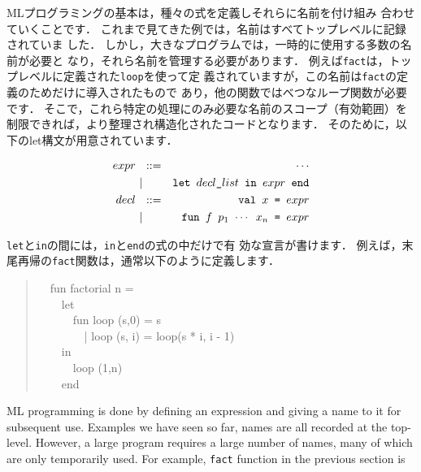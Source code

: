 \documentclass{jbook}
\newcommand{\vbar}{\mbox{\ $|$\ }}
\newcommand{\myem}{\mbox{\ \ }}
\begin{document}
\ifjp%
	MLプログラミングの基本は，種々の式を定義しそれらに名前を付け組み
合わせていくことです．
	これまで見てきた例では，名前はすべてトップレベルに記録されていま
した．
	しかし，大きなプログラムでは，一時的に使用する多数の名前が必要と
なり，それら名前を管理する必要があります．
	例えば{\tt fact}は，トップレベルに定義された{\tt loop}を使って定
義されていますが，この名前は{\tt fact}の定義のためだけに導入されたもので
あり，他の関数ではべつなループ関数が必要です．
	そこで，これら特定の処理にのみ必要な名前のスコープ（有効範囲）を
制限できれば，より整理され構造化されたコードとなります．
	そのために，以下のlet構文が用意されています．
\begin{tt}
\begin{eqnarray*}
expr &\mbox{\ \ }::=& \cdots \\
     &\vbar& \mbox{\tt let\ $decl\_list$\ in\ $expr$\ end}
\\
decl &\mbox{\ \ }::=& \mbox{\tt val\ $x$ = $expr$}
\\
     &\vbar& \mbox{\tt fun\ $f$\ $p_1$ $\cdots$ $x_n$ =  $expr$}
\end{eqnarray*}
\end{tt}
	{\tt let}と{\tt in}の間には，{\tt in}と{\tt end}の式の中だけで有
効な宣言が書けます．
	例えば，末尾再帰の{\tt fact}関数は，通常以下のように定義します．
\begin{tt}
\begin{quote}
\myem  fun factorial n =
\\\myem\myem    let
\\\myem\myem\myem      fun loop (s,0) = s
\\\myem\myem\myem\ \         | loop (s, i) = loop(s * i, i - 1)
\\\myem\myem    in
\\\myem\myem\myem      loop (1,n)
\\\myem\myem    end
\end{quote}
\end{tt}
\else%
	ML programming is done by defining an expression and giving a
name to it for subsequent use.
	Examples we have seen so far, names are all recorded at the
top-level.
	However, a large program requires a large number of names, many
of which are only temporarily used.
	For example, {\tt fact} function in the previous section is
\end{document}
